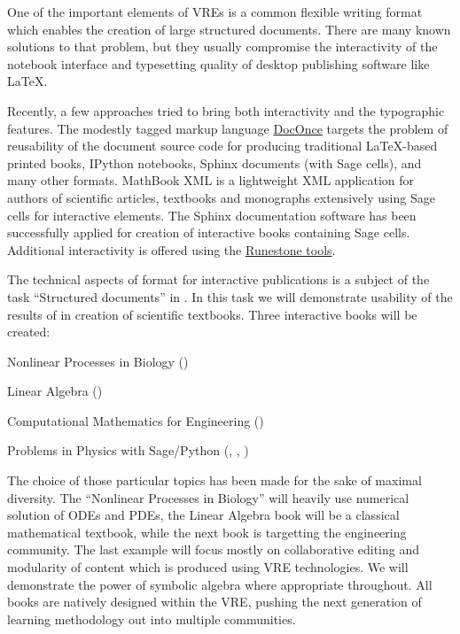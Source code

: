 \begin{workpackage}
\begin{tasklist}
\begin{task}[title=Demonstrator: Interactive books,
id=ibook,lead=US,partners={USO},PM=42,wphases={0-36,40-46}]

One of the important elements of VREs is a common flexible writing format which
enables the creation of large structured documents. There are many
known solutions to that problem, but they usually compromise the
interactivity of the notebook interface and typesetting quality of desktop
publishing software like LaTeX.

Recently, a few approaches tried to bring both interactivity and the
typographic features. The modestly tagged markup language
\href{http://hplgit.github.io/doconce/doc/web/}{DocOnce}
targets the problem of reusability of the document source code for
producing traditional LaTeX-based printed books, IPython notebooks, Sphinx
documents (with Sage cells), and many other formats. MathBook XML
is a lightweight XML application for authors of scientific articles,
textbooks and monographs extensively using Sage cells for
interactive elements. The Sphinx documentation software has been
successfully applied for creation of interactive books containing Sage
cells. Additional interactivity is offered using the \href{http://runestoneinteractive.org}{Runestone tools}.

The technical aspects of format for interactive publications is a
subject of the task ``Structured documents'' in
. In this task we will demonstrate usability
of the results of  in creation of scientific
textbooks. Three interactive books will be created:

\begin{compactitem}
\item Nonlinear Processes in Biology ()
\item Linear Algebra ()
\item Computational Mathematics for Engineering ()
\item Problems in Physics with Sage/Python (, , )
\end{compactitem}

The choice of those particular topics has been made for the sake of
maximal diversity. The ``Nonlinear Processes in Biology'' will heavily
use numerical solution of ODEs and PDEs, the Linear Algebra book will
be a classical mathematical textbook, while the next book is
targetting the engineering community.  The last example will focus
mostly on collaborative editing and modularity of content which is
produced using VRE technologies. We will demonstrate the power of
symbolic algebra where appropriate throughout.  All books are natively
designed within the VRE, pushing the next generation of learning
methodology out into multiple communities.


\end{task}
\end{tasklist}
\end{workpackage}
